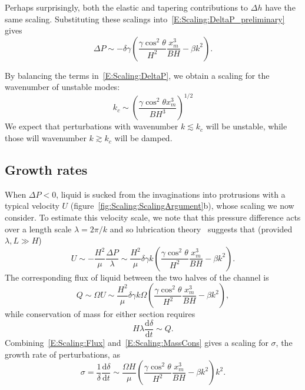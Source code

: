 \documentclass{jfm}
\newcommand{\dd}[2]{\frac{\mathrm{d} #1}{\mathrm{d} #2}}
\begin{document}
Perhaps surprisingly, both the elastic and tapering contributions to $\Delta h$ have the same scaling. Substituting these scalings into~\eqref{E:Scaling:DeltaP_preliminary} gives
\begin{equation}\label{E:Scaling:DeltaP}
\Delta P \sim -\delta \gamma \left(\frac{\gamma \cos^2 \theta}{H^2}\frac{ x_m^3}{B H} - \beta k^2\right).
\end{equation}

By balancing the terms in~\eqref{E:Scaling:DeltaP}, we obtain
a scaling for the wavenumber of unstable modes:
\begin{equation}\label{E:Scaling:CriticalWavenumber}
k_c \sim  \left(\frac{\gamma \cos^2 \theta x_m^3}{B H^3}\right)^{1/2}
\end{equation}
We expect that perturbations with wavenumber $k \lesssim k_c$ will be unstable, while those will wavenumber $k \gtrsim k_c$ will be damped. 

\subsection{Growth rates}
When $\Delta P < 0$, liquid is sucked from the invaginations into protrusions with a typical velocity $U$ (figure~\ref{fig:Scaling:ScalingArgument}b), whose scaling we now consider. To estimate this velocity scale, we note that this pressure difference acts over a length scale $\lambda = 2\pi/k$ and so lubrication theory~\citep{Leal2007} suggests that (provided $\lambda,L \gg H$)
\begin{equation}
U \sim -\frac{H^2}{\mu}\frac{\Delta P}{\lambda}\sim \frac{H^2}{\mu}  \delta \gamma k\left(\frac{\gamma \cos^2 \theta}{H^2}\frac{x_m^3}{B H} - \beta k^2\right).
\end{equation}
The corresponding flux of liquid between the two halves of the channel is
\begin{equation}\label{E:Scaling:Flux}
Q \sim \Omega U \sim\frac{H^2}{\mu}  \delta \gamma k \Omega\left(\frac{\gamma \cos^2 \theta}{H^2}\frac{ x_m^3}{B H} - \beta k^2\right),
\end{equation}
while conservation of mass for either section requires
\begin{equation}\label{E:Scaling:MassCons}
H \lambda \dd{\delta}{t} \sim Q.
\end{equation}
Combining~\eqref{E:Scaling:Flux} and~\eqref{E:Scaling:MassCons} gives a scaling for $\sigma$, the growth rate of perturbations, as
\begin{equation}\label{E:Scaling:amplitude_ode}
\sigma = \frac{1}{\delta} \dd{\delta}{t} \sim \frac{\Omega H}{\mu}\left(\frac{\gamma \cos^2 \theta}{H^2}\frac{x_m^3}{B H} - \beta k^2\right)k^2.
\end{equation}
\end{document}
